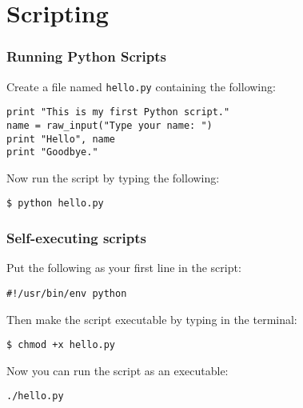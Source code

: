 \documentclass[red]{beamer}
\begin{document}
\section[Scripts]{Scripting}
\begin{frame}[fragile]
    \frametitle{Running Python Scripts}

    Create a file named \texttt{hello.py} containing the following:

    \begin{lstlisting}
print "This is my first Python script."
name = raw_input("Type your name: ")
print "Hello", name
print "Goodbye."
    \end{lstlisting}

    Now run the script by typing the following:
    \begin{block}{}
        \texttt{\$ python hello.py}
    \end{block}
\end{frame}
\begin{frame}[fragile]
    \frametitle{Self-executing scripts}

    Put the following as your first line in the script:
    \begin{lstlisting}
#!/usr/bin/env python
    \end{lstlisting}

    Then make the script executable by typing in the terminal:
    \begin{block}{}
        \texttt{\$ chmod +x hello.py}
    \end{block}

    Now you can run the script as an executable:
    \begin{block}{}
        \texttt{./hello.py}
    \end{block}
\end{frame}
\end{document}
